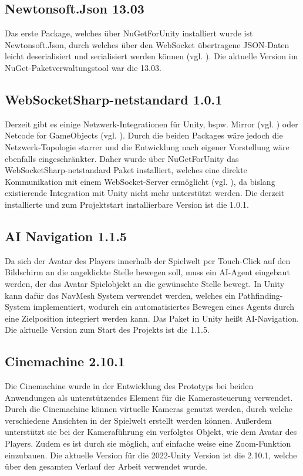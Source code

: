 \subsection{Newtonsoft.Json 13.03}
Das erste Package, welches über NuGetForUnity installiert wurde ist Newtonsoft.Json, durch welches über den WebSocket übertragene JSON-Daten leicht deserialisiert und serialisiert werden können (vgl. \citealp{newtonsoft_jsonnet_nodate}). Die aktuelle Version im NuGet-Paketverwaltungstool war die 13.03.

\subsection{WebSocketSharp-netstandard 1.0.1}
Derzeit gibt es einige Netzwerk-Integrationen für Unity, bspw. Mirror (vgl. \citealp{noauthor_mirror_nodate}) oder Netcode for GameObjects (vgl. \citealp{noauthor_about_2025}). Durch die beiden Packages wäre jedoch die Netzwerk-Topologie starrer und die Entwicklung nach eigener Vorstellung wäre ebenfalls eingeschränkter. Daher wurde über NuGetForUnity das WebSocketSharp-netstandard Paket installiert, welches eine direkte Kommunikation mit einem WebSocket-Server ermöglicht (vgl. \citealp{pingman_tools_pingmantoolswebsocket-sharp_2025}), da bislang existierende Integration mit Unity nicht mehr unterstützt werden. Die derzeit installierte und zum Projektstart installierbare Version ist die 1.0.1.

\subsection{AI Navigation 1.1.5}
Da sich der Avatar des Players innerhalb der Spielwelt per Touch-Click auf den Bildschirm an die angeklickte Stelle bewegen soll, muss ein \ac{AI}-Agent eingebaut werden, der das Avatar Spielobjekt an die gewünschte Stelle bewegt. In Unity kann dafür das NavMesh System verwendet werden, welches ein Pathfinding-System implementiert, wodurch ein automatisiertes Bewegen eines Agents durch eine Zielposition integriert werden kann. Das Paket in Unity heißt \ac{AI}-Navigation. Die aktuelle Version zum Start des Projekts ist die 1.1.5.

\subsection{Cinemachine 2.10.1}
Die Cinemachine wurde in der Entwicklung des Prototyps bei beiden Anwendungen als unterstützendes Element für die Kamerasteuerung verwendet. Durch die Cinemachine können virtuelle Kameras genutzt werden, durch welche verschiedene Ansichten in der Spielwelt erstellt werden können. Außerdem unterstützt sie bei der Kameraführung ein verfolgtes Objekt, wie dem Avatar des Players. Zudem es ist durch sie möglich, auf einfache weise eine Zoom-Funktion einzubauen. Die aktuelle Version für die 2022-Unity Version ist die 2.10.1, welche über den gesamten Verlauf der Arbeit verwendet wurde.

